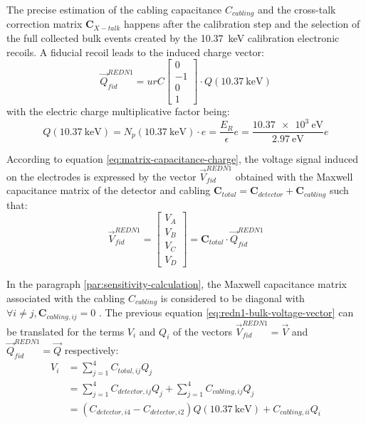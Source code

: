 The precise estimation of the cabling capacitance $C_{cabling}$ and the cross-talk correction matrix $\bm{C}_{X-talk}$ happens after the calibration step and the selection of the full collected bulk events created by the \SI{10.37}{\kilo\eV} calibration electronic recoils.
A fiducial recoil leads to the induced charge vector:
\begin{equation}
\vec{Q}_{fid}^{REDN1} =ur C
\begin{bmatrix}
0 \\ -1 \\ 0 \\ 1
\end{bmatrix}
\cdot Q(\SI{10.37}{\kilo\eV})
\end{equation}
with the electric charge multiplicative factor being:
\begin{equation}
Q(\SI{10.37}{\kilo\eV})
=
N_p(\SI{10.37}{\kilo\eV}) \cdot e
=
\frac{E_R}{\epsilon} e
=
\frac{\SI{10.37e3}{\eV}}{\SI{2.97}{\eV}} e
\end{equation}

According to equation \ref{eq:matrix-capacitance-charge}, the voltage signal induced on the electrodes is expressed by the vector $\vec{V}_{fid}^{REDN1}$ obtained with the Maxwell capacitance matrix  of the detector and cabling $\bm{C}_{total} = \bm{C}_{detector} + \bm{C}_{cabling}$ such that:
\begin{equation}
\label{eq:redn1-bulk-voltage-vector}
\vec{V}_{fid}^{REDN1}
=
\begin{bmatrix}
V_A \\ V_B \\ V_C \\ V_D
\end{bmatrix}
=
\bm{C}_{total}
\cdot
\vec{Q}_{fid}^{REDN1}
\end{equation}

In the paragraph \ref{par:sensitivity-calculation}, the Maxwell capacitance matrix associated with the cabling $C_{cabling}$ is considered to be diagonal with $\forall i \neq j, \bm{C}_{cabling, ij} = 0$ . The previous equation \ref{eq:redn1-bulk-voltage-vector} can be translated for the terms $V_i$ and $Q_i$ of the vectors $\vec{V}_{fid}^{REDN1}=\vec{V}$ and $\vec{Q}_{fid}^{REDN1}=\vec{Q}$ respectively:
\begin{equation}
\begin{split}
V_{i}
&=
\sum_{j=1}^4 C_{total, ij} Q_j
\\
&=
\sum_{j=1}^4 C_{detector, ij} Q_j + \sum_{j=1}^4 C_{cabling, ij} Q_j
\\
&=
\left(
 C_{detector, i4} - C_{detector, i2}
\right)
Q(\SI{10.37}{\kilo\eV}) + C_{cabling, ii} Q_i
\end{split}
\end{equation}

